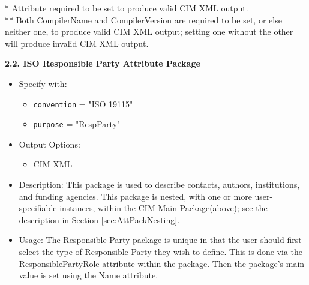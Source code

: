 \linebreak
* Attribute required to be set to produce valid CIM XML output. \\
** Both CompilerName and CompilerVersion are required to be set, or else neither one, to produce valid CIM XML output; setting one without the other will produce invalid CIM XML output. \\

\vspace{.20in}

{\bf 2.2. ISO Responsible Party Attribute Package}

\begin{itemize}
    \item Specify with:
    \begin{itemize}
        \item {\tt convention} = "ISO 19115"
        \item {\tt purpose} = "RespParty"
    \end{itemize}
    \item Output Options: 
    \begin{itemize}
        \item CIM XML 
    \end{itemize} 
    \item Description: This package is used to describe contacts, authors, institutions, and funding agencies. This package is nested, with one or more user-specifiable instances, within the CIM Main Package(above); see the description in Section \ref{sec:AttPackNesting}.
    \item Usage: The Responsible Party package is unique in that the user should first select the type of Responsible Party they wish to define. This is done via the ResponsiblePartyRole attribute within the package. Then the package's main value is set using the Name attribute.  
\end{itemize}


